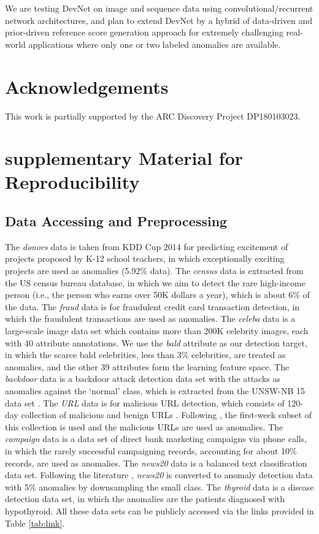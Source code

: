 \documentclass[sigconf]{acmart}
\begin{document}
We are testing DevNet on image and sequence data using convolutional/recurrent network architectures, and plan to extend DevNet by a hybrid of data-driven and prior-driven reference score generation approach for extremely challenging real-world applications where only one or two labeled anomalies are available.

\section*{Acknowledgements}
This work is partially supported by the ARC Discovery Project DP180103023.


\balance


\appendix
\section{supplementary Material for Reproducibility}

\subsection{Data Accessing and Preprocessing}\label{sec:preprocessing}
The \textit{donors} data is taken from KDD Cup 2014 for predicting excitement of projects proposed by K-12 school teachers, in which exceptionally exciting projects are used as anomalies (5.92\% data). The \textit{census} data is extracted from the US census bureau database, in which we aim to detect the rare high-income person (i.e., the person who earns over 50K dollars a year), which is about 6\% of the data. The \textit{fraud} data is for fraudulent credit card transaction detection, in which the fraudulent transactions are used as anomalies. The \textit{celeba} data is a large-scale image data set which contains more than 200K celebrity images, each with 40 attribute annotations. We use the \textit{bald} attribute as our detection target, in which the scarce bald celebrities, less than 3\% celebrities, are treated as anomalies, and the other 39 attributes form the learning feature space. The \textit{backdoor} data is a backdoor attack detection data set with the attacks as anomalies against the `normal' class, which is extracted from the UNSW-NB 15 data set \cite{moustafa2015nb15}. The \textit{URL} data is for malicious URL detection, which consists of 120-day collection of malicious and benign URLs \cite{ma2009url}. Following \cite{pang2018repen}, the first-week subset of this collection is used and the malicious URLs are used as anomalies. The \textit{campaign} data is a data set of direct bank marketing campaigns via phone calls, in which the rarely successful campaigning records, accounting for about 10\% records, are used as anomalies. The \textit{news20} data is a balanced text classification data set. Following the literature \cite{keller2012hics,pang2018repen}, \textit{news20} is converted to anomaly detection data with 5\% anomalies by downsampling the small class. The \textit{thyroid} data is a disease detection data set, in which the anomalies are the patients diagnosed with hypothyroid. All these data sets can be publicly accessed via the links provided in Table \ref{tab:link}.
\end{document}
